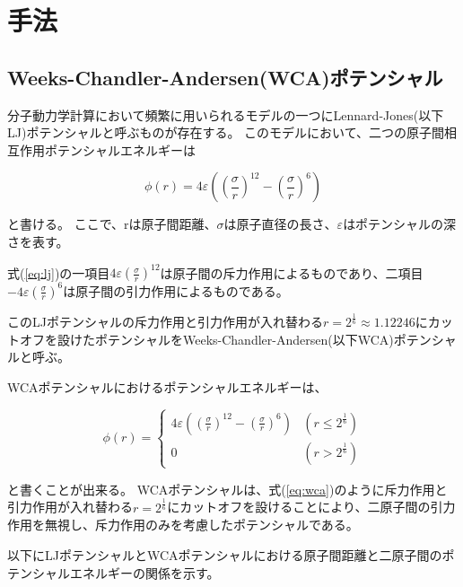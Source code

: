 \documentclass[titlepage]{jsreport}
\begin{document}
\chapter{手法} \label{chap:method}
\section{Weeks-Chandler-Andersen(WCA)ポテンシャル}
分子動力学計算において頻繁に用いられるモデルの一つにLennard-Jones(以下LJ)ポテンシャルと呼ぶものが存在する。
このモデルにおいて、二つの原子間相互作用ポテンシャルエネルギーは

\large
\begin{equation}
\phi(r)=4{\varepsilon}\left(\left(\frac{\sigma}{r}\right)^{12}-\left(\frac{\sigma}{r}\right)^6\right)\label{eq:lj}
\end{equation}

\normalsize
と書ける。
ここで、rは原子間距離、${\sigma}$は原子直径の長さ、${\varepsilon}$はポテンシャルの深さを表す。

式(\ref{eq:lj})の一項目$4{\varepsilon}(\frac{\sigma}{r})^{12}$は原子間の斥力作用によるものであり、二項目$-4\varepsilon(\frac{\sigma}{r})^{6}$は原子間の引力作用によるものである。

このLJポテンシャルの斥力作用と引力作用が入れ替わる$r=2^{\frac{1}{6}}{\approx}1.12246$にカットオフを設けたポテンシャルをWeeks-Chandler-Andersen(以下WCA)ポテンシャルと呼ぶ。

WCAポテンシャルにおけるポテンシャルエネルギーは、

\large
\begin{equation}
\phi(r) = \left\{ \begin{array}{ll}
    4{\varepsilon}\left(\left(\frac{\sigma}{r}\right)^{12}-\left(\frac{\sigma}{r}\right)^6\right) & (r\leq2^{\frac{1}{6}}) \\
    0 & (r>2^{\frac{1}{6}})\label{eq:wca}
\end{array} \right.
\end{equation}

\normalsize
と書くことが出来る\cite{doi:10.1063/1.2176675}。
WCAポテンシャルは、式(\ref{eq:wca})のように斥力作用と引力作用が入れ替わる$r=2^{\frac{1}{6}}$にカットオフを設けることにより、二原子間の引力作用を無視し、斥力作用のみを考慮したポテンシャルである。

以下にLJポテンシャルとWCAポテンシャルにおける原子間距離と二原子間のポテンシャルエネルギーの関係を示す。
\end{document}
